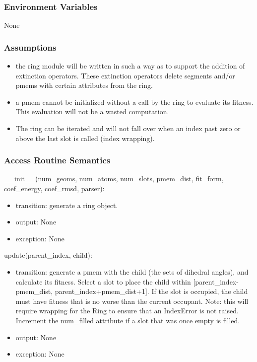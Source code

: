 \documentclass[12pt, titlepage]{article}
\begin{document}
\subsubsection{Environment Variables}

None

\subsubsection{Assumptions}

\begin{itemize}
	\item the ring module will be written in such a way as to support the 
	addition of extinction operators. These extinction operators delete 
	segments and/or pmems with certain attributes from the ring.
	\item a pmem cannot be initialized without a call by the ring to evaluate 
	its fitness. This evaluation will not be a wasted computation.
	\item The ring can be iterated and will not fall over when an index past 
	zero or above the last slot is called (index wrapping).
\end{itemize}

\subsubsection{Access Routine Semantics}

\noindent \_\_init\_\_(num\_geoms, num\_atoms, num\_slots, pmem\_dist, 
fit\_form, coef\_energy, coef\_rmsd, parser):
\begin{itemize}
	\item transition: generate a ring object.
	\item output: None
	\item exception: None
\end{itemize}

\noindent update(parent\_index, child):
\begin{itemize}
	\item transition: generate a pmem with the child (the sets of dihedral 
	angles), and calculate its fitness. Select a slot to place the child within 
	[parent\_index-pmem\_dist, parent\_index+pmem\_dist+1]. If the slot is 
	occupied, the child must have fitness that is no worse than the current 
	occupant. Note: this will require wrapping for the Ring to ensure that an 
	IndexError is not raised. Increment the num\_filled attribute if a slot 
	that was once empty is filled.
	\item output: None
	\item exception: None
\end{itemize}
\end{document}
